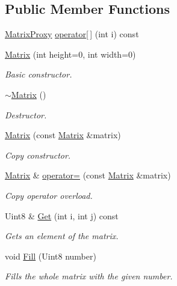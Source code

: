 \subsection*{Public Member Functions}
\begin{DoxyCompactItemize}
\item 
\hyperlink{classMatrix_1_1MatrixProxy}{MatrixProxy} \hyperlink{classMatrix_ab54bf109f85ced0472a7e0c03d16471c}{operator\mbox{[}$\,$\mbox{]}} (int i) const 
\item 
\hyperlink{classMatrix_a1cf5bd8134711df6f63e1dbef1912b86}{Matrix} (int height=0, int width=0)
\begin{DoxyCompactList}\small\item\em Basic constructor. \item\end{DoxyCompactList}\item 
\hyperlink{classMatrix_a9b1c3627f573d78a2f08623fdfef990f}{$\sim$Matrix} ()
\begin{DoxyCompactList}\small\item\em Destructor. \item\end{DoxyCompactList}\item 
\hyperlink{classMatrix_a2b1fedfb1b076d4ae504d2c61019871f}{Matrix} (const \hyperlink{classMatrix}{Matrix} \&matrix)
\begin{DoxyCompactList}\small\item\em Copy constructor. \item\end{DoxyCompactList}\item 
\hyperlink{classMatrix}{Matrix} \& \hyperlink{classMatrix_a45e4814b752129bed1f1316632f8543a}{operator=} (const \hyperlink{classMatrix}{Matrix} \&matrix)
\begin{DoxyCompactList}\small\item\em Copy operator overload. \item\end{DoxyCompactList}\item 
Uint8 \& \hyperlink{classMatrix_a06fc8df480cd88daf69eaa05867cb7bd}{Get} (int i, int j) const 
\begin{DoxyCompactList}\small\item\em Gets an element of the matrix. \item\end{DoxyCompactList}\item 
void \hyperlink{classMatrix_a4a7c3875be94e94786db920c441973e6}{Fill} (Uint8 number)
\begin{DoxyCompactList}\small\item\em Fills the whole matrix with the given number. \item\end{DoxyCompactList}\item 

\end{DoxyCompactItemize}
